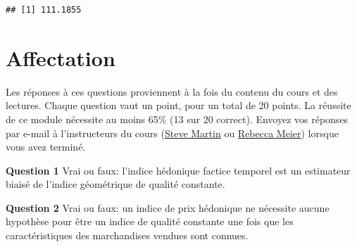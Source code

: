 \documentclass[]{article}
\newenvironment{Shaded}{\begin{snugshade}}{\end{snugshade}}
\newcommand{\CommentTok}[1]{\textcolor[rgb]{0.56,0.35,0.01}{\textit{#1}}}
\newcommand{\DataTypeTok}[1]{\textcolor[rgb]{0.13,0.29,0.53}{#1}}
\newcommand{\DecValTok}[1]{\textcolor[rgb]{0.00,0.00,0.81}{#1}}
\newcommand{\KeywordTok}[1]{\textcolor[rgb]{0.13,0.29,0.53}{\textbf{#1}}}
\newcommand{\NormalTok}[1]{#1}
\newcommand{\OperatorTok}[1]{\textcolor[rgb]{0.81,0.36,0.00}{\textbf{#1}}}
\newcommand{\StringTok}[1]{\textcolor[rgb]{0.31,0.60,0.02}{#1}}
\begin{document}
\begin{Shaded}
\end{Shaded}

\begin{verbatim}
## [1] 111.1855
\end{verbatim}

\hypertarget{affectation-2}{%
\section{Affectation}\label{affectation-2}}

Les réponses à ces questions proviennent à la fois du contenu du cours et des lectures. Chaque question vaut un point, pour un total de 20 points. La réussite de ce module nécessite au moins 65\% (13 sur 20 correct). Envoyez vos réponses par e-mail à l'instructeurs du cours (\href{mailto:steve.martin5@canada.ca}{Steve Martin} ou \href{mailto:rebecca.meier@canada.ca}{Rebecca Meier}) lorsque vous avez terminé.

\textbf{Question 1} Vrai ou faux: l'indice hédonique factice temporel est un estimateur biaisé de l'indice géométrique de qualité constante.

\textbf{Question 2} Vrai ou faux: un indice de prix hédonique ne nécessite aucune hypothèse pour être un indice de qualité constante une fois que les caractéristiques des marchandises vendues sont connues.
\end{document}
